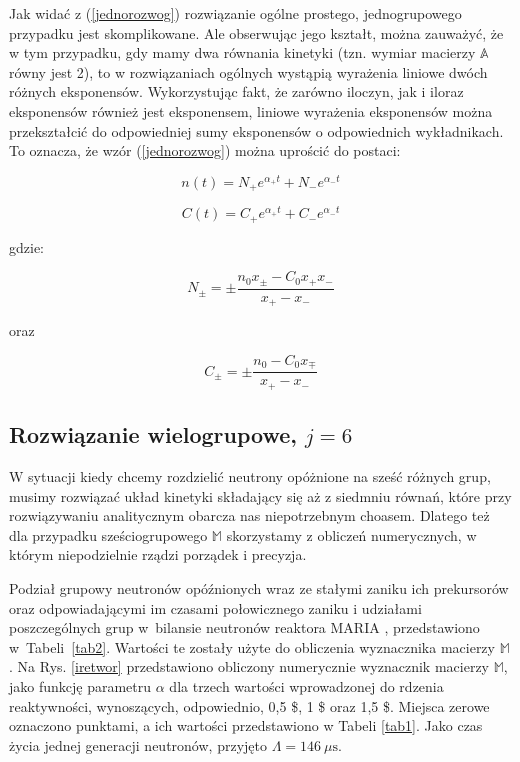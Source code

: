 	\noindent Jak widać z (\ref{jednorozwog}) rozwiązanie ogólne prostego, jednogrupowego przypadku jest skomplikowane. Ale obserwując jego kształt, można zauważyć, że w tym przypadku, gdy mamy dwa równania kinetyki (tzn. wymiar macierzy $\mathbb{A}$ równy jest 2), to w rozwiązaniach ogólnych wystąpią wyrażenia liniowe dwóch różnych eksponensów. Wykorzystując fakt, że zarówno iloczyn, jak i iloraz eksponensów również jest eksponensem, liniowe wyrażenia eksponensów można przekształcić do odpowiedniej sumy eksponensów o odpowiednich wykładnikach. To oznacza, że wzór (\ref{jednorozwog}) można uprościć do postaci:
	
	\begin{equation}
		n(t)=N_+e^{\alpha_+t}+N_-e^{\alpha_-t}
		\label{n_suma_exp}
	\end{equation}
	
	\begin{equation}
		C(t)=C_{+}e^{\alpha_+t}+C_{-}e^{\alpha_-t}
		\label{C_suma_exp}
	\end{equation}
	
	\noindent gdzie:
	
	\begin{equation}
		N_{\pm}=\pm \frac{n_0x_{\pm}-C_0x_+x_-}{x_+-x_-}
		\label{nenenenenenenenne}
	\end{equation}
	
	\noindent oraz 
	
	\begin{equation}
		C_{\pm}=\pm \frac{n_0-C_0x_{\mp}}{x_+-x_-}
		\label{yuertueyt}
	\end{equation}
\newpage
\subsection{Rozwiązanie wielogrupowe, $j=6$}\label{wielogrupowe}
W sytuacji kiedy chcemy rozdzielić neutrony opóżnione na sześć różnych grup, musimy  rozwiązać  układ kinetyki składający się aż z  siedmniu równań, które przy rozwiązywaniu analitycznym obarcza nas niepotrzebnym choasem. 
Dlatego też dla przypadku sześciogrupowego  $\mathbb{M}$ skorzystamy z obliczeń numerycznych, w którym niepodzielnie rządzi porządek i precyzja. 


Podział grupowy neutronów opóźnionych wraz ze stałymi zaniku ich prekursorów oraz odpowiadającymi im czasami połowicznego zaniku i udziałami poszczególnych grup w~bilansie neutronów reaktora MARIA \cite{kubowski}, przedstawiono w~Tabeli~\ref{tab2}. Wartości te zostały użyte do obliczenia wyznacznika macierzy $\mathbb{M}$. Na Rys. \ref{iretwor} przedstawiono obliczony numerycznie wyznacznik macierzy $\mathbb{M}$, jako funkcję parametru $\alpha$ dla trzech wartości wprowadzonej do rdzenia reaktywności, wynoszących, odpowiednio, 0,5 \$, 1 \$ oraz 1,5 \$. Miejsca zerowe oznaczono punktami, a ich wartości przedstawiono w Tabeli \ref{tab1}. Jako czas życia jednej generacji neutronów, przyjęto $\Lambda = 146 \ \mu \mathrm{s}$.

